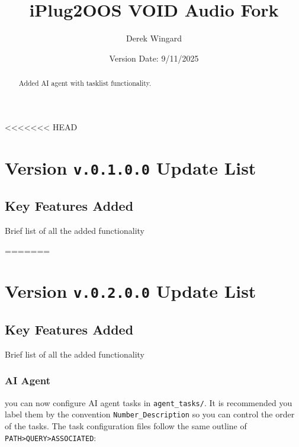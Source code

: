 \documentclass[twocolumn,natbib]{svjour3}        %
\begin{document}
\title{iPlug2OOS VOID Audio Fork}

\author{Derek Wingard}


\date{Version Date: 9/11/2025}

\maketitle

\begin{abstract}
    Added AI agent with tasklist functionality.
\end{abstract}

<<<<<<< HEAD
\section{Version \texttt{v.0.1.0.0} Update List}
\subsection{Key Features Added}
Brief list of all the added functionality

=======
\section{Version \texttt{v.0.2.0.0} Update List}
\subsection{Key Features Added}
Brief list of all the added functionality
\subsubsection{AI Agent}
you can now configure AI agent tasks in \texttt{agent\_tasks/}. It is recommended you label them by the convention \texttt{Number\_Description} so you can control the order of the tasks. 
The task configuration files follow the same outline of \texttt{PATH>QUERY>ASSOCIATED}:
\end{document}
